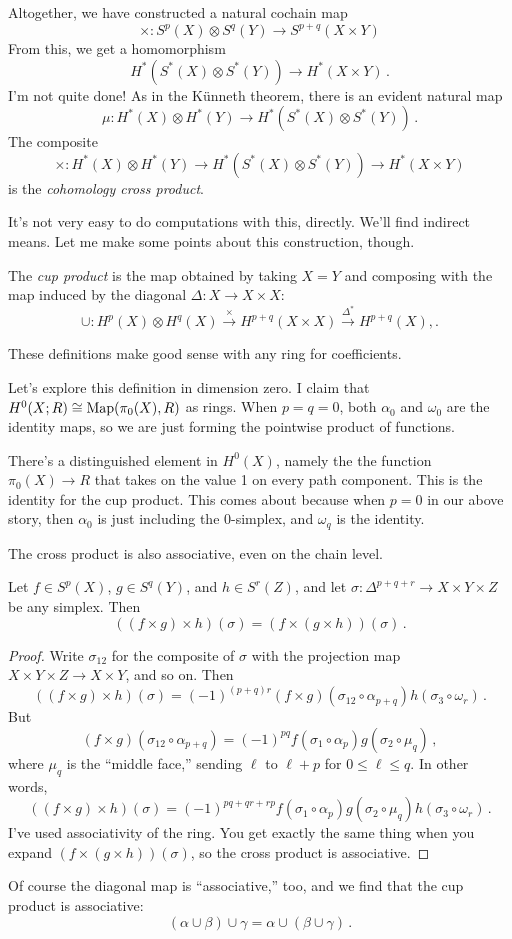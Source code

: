Altogether, we have constructed a natural cochain map
\[
\times:S^p(X)\otimes S^q(Y)\to S^{p+q}(X\times Y)
\]
From this, we get a homomorphism
\[
H^\ast(S^\ast(X)\otimes S^\ast(Y))\to H^\ast(X\times Y)\,.
\]
I'm not quite done! As in the K\"unneth theorem, there is an evident natural 
map 
\[
\mu: H^\ast(X)\otimes H^\ast(Y)\to H^\ast(S^\ast(X)\otimes S^\ast(Y))\,.
\] 
The composite
\[
\times:H^\ast(X)\otimes H^\ast(Y)\to H^\ast(S^\ast(X)\otimes S^\ast(Y))\to H^\ast(X\times Y)
\]
 is the {\em cohomology cross product}.

It's not very easy to do computations with this, directly. We'll find indirect means. Let me make some points about this construction, though.
\begin{definition}
The {\em cup product} is the map obtained by taking $X=Y$ and composing with
the map induced by the diagonal $\Delta:X\to X\times X$:
\[
\cup:H^p(X)\otimes H^q(X)\xrightarrow{\times} H^{p+q}(X\times X)\xrightarrow{\Delta^\ast} H^{p+q}(X),.
\]
\end{definition}
These definitions make good sense with any ring for coefficients.

Let's explore this definition in dimension zero. 
I claim that $ H^0(X;R)\cong\operatorname{Map}(\pi_0(X),R)$ as rings. When $p=q=0$, both $\alpha_0$ and $\omega_0$ are the identity maps, so we are just forming the 
pointwise product of functions. 

There's a distinguished element in $H^0(X)$, namely the the function $\pi_0(X)\to R$ that takes on the value 1 on every path component. 
This is the identity for the cup product. This comes about because when $p=0$ in our above story, then $\alpha_0$ is just including the $0$-simplex, and $\omega_q$ is the identity. 

The cross product is also associative, even on the chain level. 
\begin{prop}
Let $f\in S^p(X)$, $g\in S^q(Y)$, and $h\in S^r(Z)$, and let 
$\sigma:\Delta^{p+q+r}\to X\times Y\times Z$ be any simplex. Then
\[
((f\times g)\times h)(\sigma)=(f\times(g\times h))(\sigma)\,.
\]
\end{prop}
\begin{proof}
Write $\sigma_{12}$ for the composite of $\sigma$ with the projection map
$X\times Y\times Z\to X\times Y$, and so on. Then
\[
((f\times g)\times h)(\sigma)=(-1)^{(p+q)r}
(f\times g)(\sigma_{12}\circ\alpha_{p+q})h(\sigma_3\circ\omega_r)\,.
\]
But 
\[(f\times g)(\sigma_{12}\circ\alpha_{p+q})=(-1)^{pq}
f(\sigma_1\circ\alpha_p)g(\sigma_2\circ\mu_q)\,,
\] 
where $\mu_q$ is the ``middle face,'' sending $\ell$ to $\ell+p$ for
$0\leq\ell\leq q$. In other words, 
\[
((f\times g)\times h)(\sigma)=(-1)^{pq+qr+rp}
f(\sigma_1\circ\alpha_p)g(\sigma_2\circ\mu_q)h(\sigma_3\circ\omega_r)\,.
\]
I've used associativity of the ring. You get exactly the same thing when
you expand $(f\times(g\times h))(\sigma)$, so the cross product is associative.
\end{proof}

Of course the diagonal map is ``associative,'' too, and we find that the
cup product is associative:
\[
(\alpha\cup\beta)\cup\gamma=\alpha\cup(\beta\cup\gamma)\,.
\]


